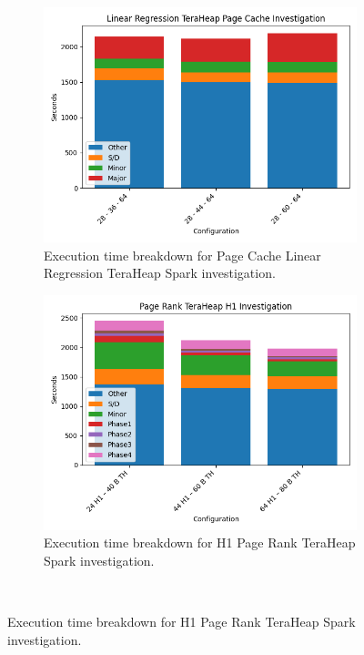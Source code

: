 \begin{figure}[htbp]
\begin{subfigure}[b]{0.48\textwidth}
    \includegraphics[width=\linewidth]{./fig/linr_pc_th.png}
    \caption{Execution time breakdown for Page Cache Linear Regression TeraHeap Spark investigation.}
    \label{fig:linr_pc_th}
\end{subfigure}

	\begin{subfigure}[b]{0.48\textwidth}
    \includegraphics[width=\linewidth]{./fig/pr_h1_th.png}
    \caption{Execution time breakdown for H1 Page Rank TeraHeap Spark
    investigation.} 
    \label{fig:pr_h1_th}
	\end{subfigure}\\[1em]
\end{figure}

